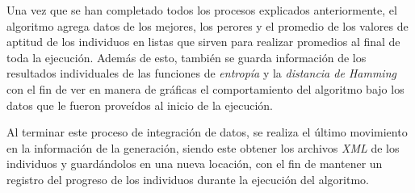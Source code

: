 Una vez que se han completado todos los procesos explicados anteriormente, el
algoritmo agrega datos de los mejores, los perores y el promedio de los valores
de aptitud de los individuos en listas que sirven para realizar promedios al
final de toda la ejecución. Además de esto, también se guarda
información de los resultados individuales de las funciones de \textit{entropía}
y la \textit{distancia de Hamming} con el fin de ver en manera de gráficas el
comportamiento del algoritmo bajo los datos que le fueron proveídos al inicio de
la ejecución. 

Al terminar este proceso de integración de datos, se realiza el
último movimiento en la información de la generación, siendo este obtener los
archivos \textit{XML} de los individuos y guardándolos en una nueva locación, con
el fin de mantener un registro del progreso de los individuos durante la
ejecución del algoritmo.